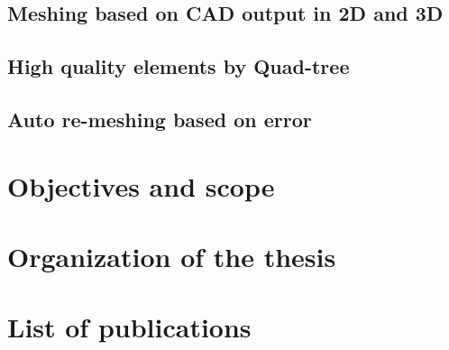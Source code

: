     \subsection{Meshing based on CAD output in 2D and 3D}

    \subsection{High quality elements by Quad-tree}

    \subsection{Auto re-meshing based on error}

\section{Objectives and scope}

\section{Organization of the thesis}

\section{List of publications}



